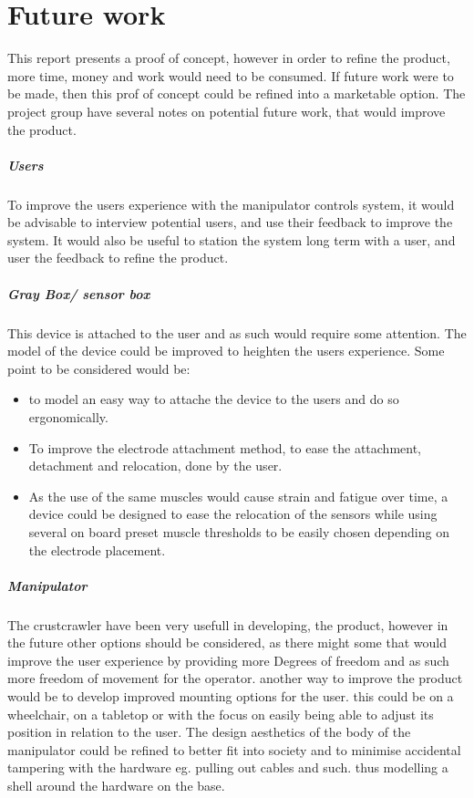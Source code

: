 \chapter{Future work}
This report presents a proof of concept, however in order to refine the product, more time, money and work would need to be consumed. 
If future work were to be made, then this prof of concept could be refined into a marketable option.
The project group have several notes on potential future work, that would improve the product.
\paragraph{Users} 
To improve the users experience with the manipulator controls system, it would be advisable to interview potential users, and use their feedback to improve the system. It would also be useful to station the system long term with a user, and user the feedback to refine the product.
\paragraph{Gray Box/ sensor box} 
This device is attached to the user and as such would require some attention. 
The model of the device could be improved to heighten the users experience. 
Some point to be considered would be:
\begin{itemize}
    \item to model an easy way to attache the device to the users and do so ergonomically. 
    \item To improve the electrode attachment method, to ease the attachment, detachment and relocation, done by the user.
    \item As the use of the same muscles would cause strain and fatigue over time, a device could be designed to ease the relocation of the sensors while using several on board preset muscle thresholds to be easily chosen depending on the electrode placement. 
\end{itemize}

\paragraph{Manipulator}
The crustcrawler have been very usefull in developing, the product, however in the future other options should be considered, as there might some that would improve the user experience by providing more Degrees of freedom and as such more freedom of movement for the operator.
another way to improve the product would be to develop improved mounting options for the user. this could be on a wheelchair, on a tabletop or with the focus on easily being able to adjust its position in relation to the user.
The design aesthetics of the body of the manipulator could be refined to better fit into society and to minimise accidental tampering with the hardware eg. pulling out cables and such. thus modelling a shell around the hardware on the base.

